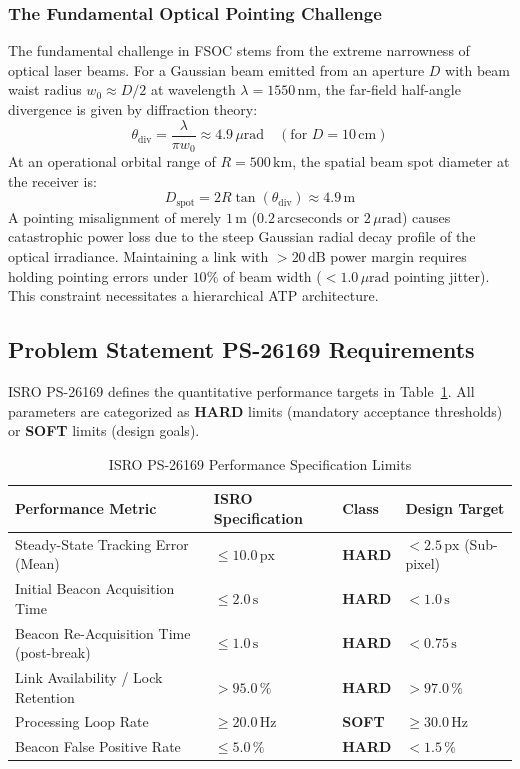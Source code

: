 \documentclass[11pt,a4paper]{article}
\begin{document}
\subsubsection{The Fundamental Optical Pointing Challenge}
The fundamental challenge in FSOC stems from the extreme narrowness of optical laser beams. For a Gaussian beam emitted from an aperture $D$ with beam waist radius $w_0 \approx D/2$ at wavelength $\lambda = 1550\,\text{nm}$, the far-field half-angle divergence is given by diffraction theory:
\begin{equation}
    \theta_{\text{div}} = \frac{\lambda}{\pi w_0} \approx 4.9\,\mu\text{rad} \quad (\text{for } D = 10\,\text{cm})
\end{equation}
At an operational orbital range of $R = 500\,\text{km}$, the spatial beam spot diameter at the receiver is:
\begin{equation}
    D_{\text{spot}} = 2 R \tan(\theta_{\text{div}}) \approx 4.9\,\text{m}
\end{equation}
A pointing misalignment of merely $1\,\text{m}$ ($0.2\,\text{arcseconds}$ or $2\,\mu\text{rad}$) causes catastrophic power loss due to the steep Gaussian radial decay profile of the optical irradiance. Maintaining a link with $>20\,\text{dB}$ power margin requires holding pointing errors under $10\%$ of beam width ($< 1.0\,\mu\text{rad}$ pointing jitter). This constraint necessitates a hierarchical ATP architecture.

\subsection{Problem Statement PS-26169 Requirements}
ISRO PS-26169 defines the quantitative performance targets in Table~\ref{tab:isro_specs}. All parameters are categorized as \textbf{HARD} limits (mandatory acceptance thresholds) or \textbf{SOFT} limits (design goals).

\begin{table}[htbp]
\centering
\small
\caption{ISRO PS-26169 Performance Specification Limits}
\label{tab:isro_specs}
\begin{tabularx}{\linewidth}{@{}p{6.2cm} p{3.0cm} p{2.0cm} X@{}}
\toprule
\textbf{Performance Metric} & \textbf{ISRO Specification} & \textbf{Class} & \textbf{Design Target} \\
\midrule
Steady-State Tracking Error (Mean) & $\le 10.0\,\text{px}$ & \textbf{HARD} & $< 2.5\,\text{px}$ (Sub-pixel) \\
Initial Beacon Acquisition Time    & $\le 2.0\,\text{s}$  & \textbf{HARD} & $< 1.0\,\text{s}$ \\
Beacon Re-Acquisition Time (post-break) & $\le 1.0\,\text{s}$ & \textbf{HARD} & $< 0.75\,\text{s}$ \\
Link Availability / Lock Retention & $> 95.0\,\%$          & \textbf{HARD} & $> 97.0\,\%$ \\
Processing Loop Rate               & $\ge 20.0\,\text{Hz}$ & \textbf{SOFT} & $\ge 30.0\,\text{Hz}$ \\
Beacon False Positive Rate         & $\le 5.0\,\%$         & \textbf{HARD} & $< 1.5\,\%$ \\
\bottomrule
\end{tabularx}
\end{table}
\end{document}
